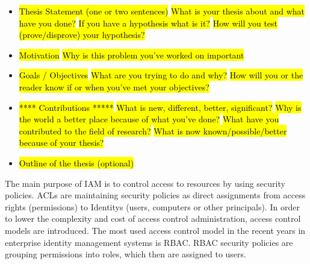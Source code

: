 \begin{itemize}
    \item \hl{Thesis Statement (one or two sentences)}
        \subitem \hl{What is your thesis about and what have you done?}
        \subitem \hl{If you have a hypothesis what is it?}
        \subitem \hl{How will you test (prove/disprove) your hypothesis?}
    \item \hl{Motivation}
        \subitem \hl{Why is this problem you've worked on important}
    \item \hl{Goals / Objectives}
        \subitem \hl{What are you trying to do and why?}
        \subitem \hl{How will you or the reader know if or when you've met your objectives?}
    \item \hl{**** Contributions *****}
        \subitem \hl{What is new, different, better, significant?}
        \subitem \hl{Why is the world a better place because of what you've done?}
        \subitem \hl{What have you contributed to the field of research?}
        \subitem \hl{What is now known/possible/better because of your thesis?}
    \item \hl{Outline of the thesis (optional)}
\end{itemize}
\fi

The main purpose of \gls{IAM} is to control access to resources by using security policies. \glspl{ACL} are maintaining security policies as direct assignments from access rights (permissions) to \glspl{Identity} (users, computers or other principals). In order to lower the complexity and cost of access control administration, access control models are introduced. The most used access control model in the recent years in enterprise identity management systems is \gls{RBAC}. \cite{Kunz} \gls{RBAC} security policies are grouping permissions into roles, which then are assigned to users.\\

\iffalse
Role-based access control (RBAC) is the most used access control model in enterprise identity management systems nowadays \cite{Kunz} due to the advantage to lower the complexity and cost of access control administration. But also Attribute-based access control (ABAC) is getting more popular due to its higher flexibility. Both access control models have their advantages and disadvantages. \cite{Hu13guideto} \cite{Coyne:2013}\\
\fi 

\iffalse
Access Control Lists (ACL) are maintaining security policies, which can be represented as tuples <U,P,UP>. Here, U is representing a set of users (identities), P denotes a set of permissions (access rights) and UP ⊆ U × P denotes a user-permission assignment.
In RBAC security policies are defined by tuples <U,P,R,UR,RP,RR>. \cite{DuChang}
\fi

